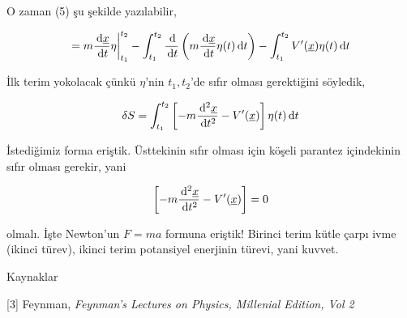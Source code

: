 \documentclass[12pt,fleqn]{article}\usepackage{../../common}
\begin{document}
O zaman (5) şu şekilde yazılabilir,

$$ 
= m \frac{\,\mathrm{d} \underline{x}}{\,\mathrm{d} t} \eta \bigg\vert _{t_1}^{t_2} 
- \int _{t_1}^{t_2} \frac{\,\mathrm{d}}{\,\mathrm{d} t} \left( m \frac{\,\mathrm{d} \underline{x}}{\,\mathrm{d} t} \eta(t) \,\mathrm{d} t\right)
- \int _{t_1}^{t_2} V'(\underline{x}) \eta(t) \,\mathrm{d} t
$$

İlk terim yokolacak çünkü $\eta$'nin $t_1,t_2$'de sıfır olması gerektiğini söyledik,

$$ 
\delta S = 
\int _{t_1}^{t_2} \left[ 
-m \frac{\,\mathrm{d}^2 \underline{x}}{\,\mathrm{d} t^2} - V'(\underline{x})
\right] 
\eta(t) \,\mathrm{d} t
$$

İstediğimiz forma eriştik. Üsttekinin sıfır olması için köşeli parantez
içindekinin sıfır olması gerekir, yani

$$ 
\left[ 
-m \frac{\,\mathrm{d}^2 \underline{x}}{\,\mathrm{d} t^2} - V'(\underline{x})
\right]  = 0
$$

olmalı. İşte Newton'un $F = ma$ formuna eriştik! Birinci terim kütle çarpı
ivme (ikinci türev), ikinci terim potansiyel enerjinin türevi, yani kuvvet.

Kaynaklar 

[3] Feynman, {\em Feynman's Lectures on Physics, Millenial Edition, Vol 2} 
\end{document}
